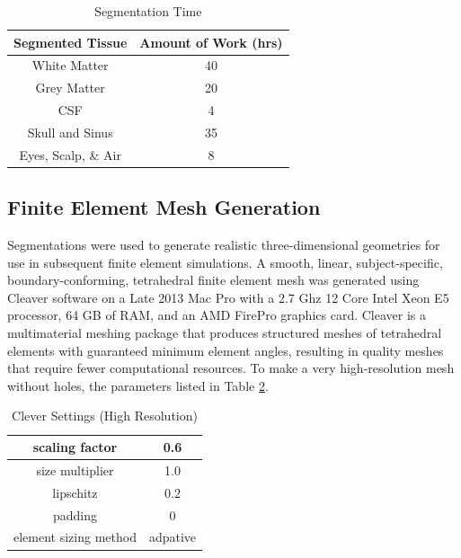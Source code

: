 \begin{table}[H]
\centering
\caption{Segmentation Time}
\label{tab:seg}
\begin{tabular}{|c|c|}
\hline
Segmented Tissue    & Amount of Work (hrs) \\ \hline
White Matter       & 40                   \\ \hline
Grey Matter         & 20                   \\ \hline
CSF                 & 4                    \\ \hline
Skull and Sinus     & 35                   \\ \hline
Eyes, Scalp, \& Air & 8                    \\ \hline
\end{tabular}
\end{table}

\subsection{Finite Element Mesh Generation}
\label{sec:mesh}


Segmentations were used to generate realistic three-dimensional geometries for use in subsequent finite element simulations. A smooth, linear, subject-specific, boundary-conforming, tetrahedral finite element mesh was generated using Cleaver software \cite{ref:cleaver} on a Late 2013 Mac Pro with a 2.7 Ghz 12 Core Intel Xeon E5 processor, 64 GB of RAM, and an AMD FirePro graphics card. Cleaver is a multimaterial meshing package that produces structured meshes of tetrahedral elements with guaranteed minimum element angles, resulting in quality meshes that require fewer computational resources. To make a very high-resolution mesh without holes, the parameters listed in Table \ref{tab:cleaver}.
\begin{table}[H]
\centering
\caption{Clever Settings (High Resolution)}
\label{tab:cleaver}
\begin{tabular}{|c|c|}
\hline
scaling factor                    & 0.6                 \\ \hline
size multiplier                   & 1.0                 \\ \hline
lipschitz                         & 0.2                 \\ \hline
padding                           & 0                   \\ \hline
element sizing method             & adpative            \\ \hline
\end{tabular}
\end{table}

